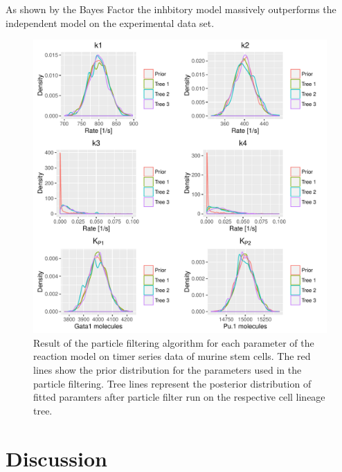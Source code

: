 \documentclass{bioinfo}
\begin{document}
As shown by the Bayes Factor the inhbitory model massively outperforms the independent model on the experimental data set.


\begin{figure}[h]
\includegraphics[width=\textwidth]{figures/real_data.pdf}
\caption{Result of the particle filtering algorithm for each parameter of the reaction model on timer series data of murine stem cells. The red lines show the prior distribution for the parameters used in the particle filtering. Tree lines represent the posterior distribution of fitted paramters after particle filter run  on the respective cell lineage tree.}  \label{fig:05}
\end{figure}

\section{Discussion}
\end{document}
